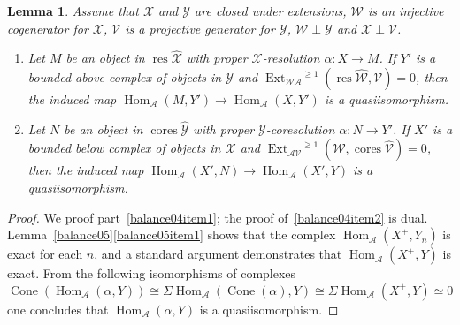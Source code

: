\documentclass{amsart}
\newtheorem{lem}{Lemma}[section]
\begin{document}
\begin{lem} \label{balance04}
Assume that ${{\mathcal{{X}}}}$ and ${{\mathcal{{Y}}}}$ are closed under extensions, 
${{\mathcal{{W}}}}$ is an injective cogenerator for ${{\mathcal{{X}}}}$, 
${{\mathcal{{V}}}}$ is a projective generator for ${{\mathcal{{Y}}}}$,
${{\mathcal{{W}}}}\perp{{\mathcal{{Y}}}}$ and ${{\mathcal{{X}}}}\perp{{\mathcal{{V}}}}$.
\begin{enumerate}[\quad\rm(a)]
\item \label{balance04item1}
Let $M$ be an object in ${{\operatorname{res}{\widehat{{{\mathcal{{{X}}}}}}}}}$ with proper ${{\mathcal{{X}}}}$-resolution
$\alpha\colon X\to M$.  If $Y'$ is a bounded above complex of objects in ${{\mathcal{{Y}}}}$
and ${{\operatorname{Ext}}_{{{\mathcal{{W}}}} {{\mathcal{{A}}}}}}^{{\geqslant}1}({{\operatorname{res}{\widehat{{{\mathcal{{{W}}}}}}}}},{{\mathcal{{V}}}})=0$,
then the induced map ${{\operatorname{Hom}}_{{\mathcal{{A}}}}}(M,Y')\to{{\operatorname{Hom}}_{{\mathcal{{A}}}}}(X,Y')$ is a quasiisomorphism.
\item \label{balance04item2}
Let $N$ be an object in ${{\operatorname{cores}{\widehat{{{\mathcal{{{Y}}}}}}}}}$ with proper ${{\mathcal{{Y}}}}$-coresolution
$\alpha\colon N\to Y'$.  If $X'$ is a bounded below complex of objects in ${{\mathcal{{X}}}}$
and ${{\operatorname{Ext}}_{{{\mathcal{{A}}}}{{\mathcal{{V}}}}}}^{{\geqslant}1}({{\mathcal{{W}}}}, {{\operatorname{cores}{\widehat{{{\mathcal{{{V}}}}}}}}})=0$,
then the induced map ${{\operatorname{Hom}}_{{\mathcal{{A}}}}}(X',N)\to{{\operatorname{Hom}}_{{\mathcal{{A}}}}}(X',Y)$ is a quasiisomorphism.
\end{enumerate}
\end{lem}

\begin{proof}
We proof part~\eqref{balance04item1}; the proof of~\eqref{balance04item2} is dual.
Lemma~\ref{balance05}\eqref{balance05item1}
shows that the complex ${{\operatorname{Hom}}_{{\mathcal{{A}}}}}(X^+,Y_n)$ is exact for each $n$, and
a standard argument demonstrates that
${{\operatorname{Hom}}_{{\mathcal{{A}}}}}(X^+,Y)$ is exact.
From the following isomorphisms of complexes
$${\operatorname{Cone}}({{\operatorname{Hom}}_{{\mathcal{{A}}}}}(\alpha,Y))\cong{\mathsf{\Sigma}}{{\operatorname{Hom}}_{{\mathcal{{A}}}}}({\operatorname{Cone}}(\alpha),Y)
\cong{\mathsf{\Sigma}}{{\operatorname{Hom}}_{{\mathcal{{A}}}}}(X^+,Y)\simeq 0$$
one concludes that ${{\operatorname{Hom}}_{{\mathcal{{A}}}}}(\alpha,Y)$ 
is a quasiisomorphism.
\end{proof}
\end{document}
